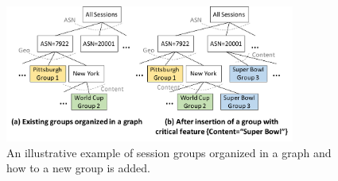 

%
%
%
%
%





\begin{figure}[t!]
\centering
\includegraphics[width=0.85\textwidth]{figures/pytheas-grouping-example-2.pdf}
\caption{An illustrative example of session groups organized in a graph and how to a new group is added.}
\label{fig:grouping-example}
\end{figure}







